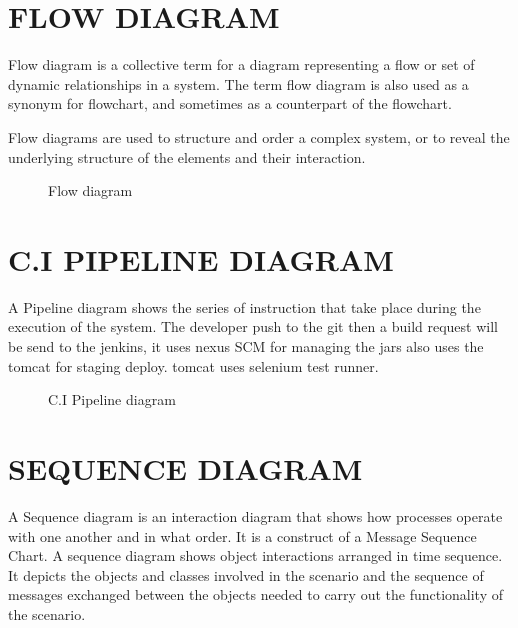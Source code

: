 \documentclass[12pt,a4paper,oneside]{report}
\begin{document}
{\begin{figure}[h]
\end{figure}
\newpage
\section{FLOW DIAGRAM}
Flow diagram is a collective term for a diagram representing a flow or set of dynamic relationships in a system. The term flow diagram is also used as a synonym for flowchart, and sometimes as a counterpart of the flowchart.

Flow diagrams are used to structure and order a complex system, or to reveal the underlying structure of the elements and their interaction.
\begin{figure}[h]
\begin{center}

\hspace{.0 in}
\caption{Flow diagram}
\end{center}

\end{figure}
\pagebreak
\section{C.I PIPELINE DIAGRAM}
A Pipeline diagram shows the series of instruction that take place during the execution of the system. The developer push to the git then a build request will be send to the jenkins, it uses nexus SCM for managing the jars also uses the tomcat for staging deploy. tomcat uses selenium test runner.
\begin{figure}[h]
\begin{center}

\hspace{.0 in}
\caption{C.I Pipeline diagram}
\end{center}

\end{figure}
\pagebreak
\section{SEQUENCE DIAGRAM}
\par A Sequence diagram is an interaction diagram that shows how processes operate with
one another and in what order. It is a construct of a Message Sequence Chart. A sequence
diagram shows object interactions arranged in time sequence. It depicts the objects and classes
involved in the scenario and the sequence of messages exchanged between the objects needed
to carry out the functionality of the scenario.
\begin{figure}[h]
\begin{center}


\end{center}
\end{figure}}
\end{document}
